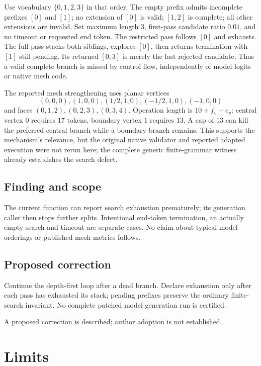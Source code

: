 \documentclass[11pt]{article}
\begin{document}
Use vocabulary \(\{0,1,2,3\}\) in that order. The empty prefix admits incomplete prefixes \([0]\) and \([1]\); no extension of \([0]\) is valid; \([1,2]\) is complete; all other extensions are invalid. Set maximum length \(3\), first-pass candidate ratio \(0.01\), and no timeout or requested end token. The restricted pass follows \([0]\) and exhausts. The full pass stacks both siblings, explores \([0]\), then returns termination with \([1]\) still pending. Its returned \([0,3]\) is merely the last rejected candidate. Thus a valid complete branch is missed by control flow, independently of model logits or native mesh code.

The reported mesh strengthening uses planar vertices \[(0,0,0),(1,0,0),(1/2,1,0),(-1/2,1,0),(-1,0,0)\] and faces \((0,1,2),(0,2,3),(0,3,4)\). Operation length is \(10+f_v+e_v\): central vertex \(0\) requires \(17\) tokens, boundary vertex \(1\) requires \(13\). A cap of \(13\) can kill the preferred central branch while a boundary branch remains. This supports the mechanism’s relevance, but the original native validator and reported adapted execution were not rerun here; the complete generic finite-grammar witness already establishes the search defect.

\subsection*{Finding and scope}

The current function can report search exhaustion prematurely; its generation caller then stops further splits. Intentional end-token termination, an actually empty search and timeout are separate cases. No claim about typical model orderings or published mesh metrics follows.

\subsection*{Proposed correction}

Continue the depth-first loop after a dead branch. Declare exhaustion only after each pass has exhausted its stack; pending prefixes preserve the ordinary finite-search invariant. No complete patched model-generation run is certified.

A proposed correction is described; author adoption is not established.

\section*{Limits}
\end{document}
